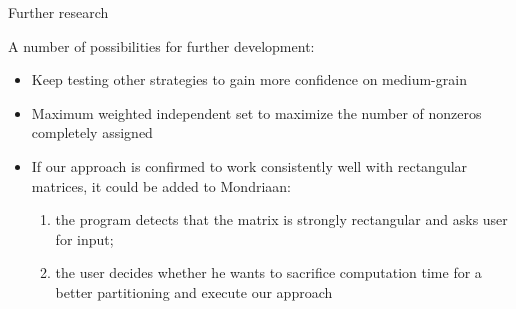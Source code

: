 \documentclass[10pt,serif]{beamer}
\begin{document}
\begin{frame}{Further research}

A number of possibilities for further development:

\begin{itemize}
	\item Keep testing other strategies to gain more confidence on medium-grain
	\item Maximum weighted independent set to maximize the number of nonzeros completely assigned
	\item If our approach is confirmed to work consistently well with rectangular matrices, it could be added to Mondriaan:
		\begin{enumerate}
			\item the program detects that the matrix is strongly rectangular and asks user for input;
			\item the user decides whether he wants to sacrifice computation time for a better partitioning and execute our approach
		\end{enumerate}
\end{itemize}
	
\end{frame}
\end{document}

